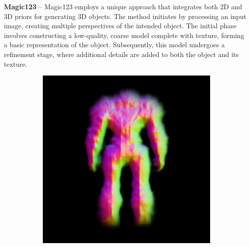 \textbf{Magic123} – Magic123 employs a unique approach that integrates both 2D and 3D priors for generating 3D objects. The method initiates by processing an input image, creating multiple perspectives of the intended object. The initial phase involves constructing a low-quality, coarse model complete with texture, forming a basic representation of the object. Subsequently, this model undergoes a refinement stage, where additional details are added to both the object and its texture.

\begin{figure}[ht]
    \centering
    \begin{subfigure}[b]{0.25\textwidth}
        \centering
        \fontsize{9pt}{7pt}\selectfont{}\vspace{.1cm}
        \includegraphics[width=\textwidth]{etc/a robot made out of plants/magic123/magic123_coarse_robot_front_0_part2.png}

\end{subfigure}
\end{figure}
